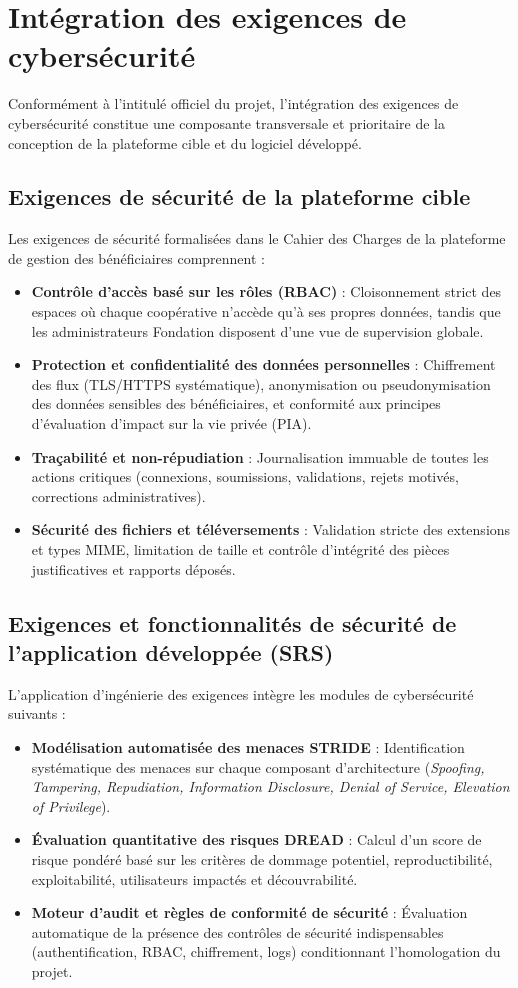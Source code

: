 \section{Intégration des exigences de cybersécurité}

Conformément à l'intitulé officiel du projet, l'intégration des exigences de cybersécurité constitue une composante transversale et prioritaire de la conception de la plateforme cible et du logiciel développé.

\subsection{Exigences de sécurité de la plateforme cible}
Les exigences de sécurité formalisées dans le Cahier des Charges de la plateforme de gestion des bénéficiaires comprennent :
\begin{itemize}
    \item \textbf{Contrôle d'accès basé sur les rôles (RBAC)} : Cloisonnement strict des espaces où chaque coopérative n'accède qu'à ses propres données, tandis que les administrateurs Fondation disposent d'une vue de supervision globale.
    \item \textbf{Protection et confidentialité des données personnelles} : Chiffrement des flux (TLS/HTTPS systématique), anonymisation ou pseudonymisation des données sensibles des bénéficiaires, et conformité aux principes d'évaluation d'impact sur la vie privée (PIA).
    \item \textbf{Traçabilité et non-répudiation} : Journalisation immuable de toutes les actions critiques (connexions, soumissions, validations, rejets motivés, corrections administratives).
    \item \textbf{Sécurité des fichiers et téléversements} : Validation stricte des extensions et types MIME, limitation de taille et contrôle d'intégrité des pièces justificatives et rapports déposés.
\end{itemize}

\subsection{Exigences et fonctionnalités de sécurité de l'application développée (SRS)}
L'application d'ingénierie des exigences intègre les modules de cybersécurité suivants :
\begin{itemize}
    \item \textbf{Modélisation automatisée des menaces STRIDE} : Identification systématique des menaces sur chaque composant d'architecture (\textit{Spoofing, Tampering, Repudiation, Information Disclosure, Denial of Service, Elevation of Privilege}).
    \item \textbf{Évaluation quantitative des risques DREAD} : Calcul d'un score de risque pondéré basé sur les critères de dommage potentiel, reproductibilité, exploitabilité, utilisateurs impactés et découvrabilité.
    \item \textbf{Moteur d'audit et règles de conformité de sécurité} : Évaluation automatique de la présence des contrôles de sécurité indispensables (authentification, RBAC, chiffrement, logs) conditionnant l'homologation du projet.
\end{itemize}

